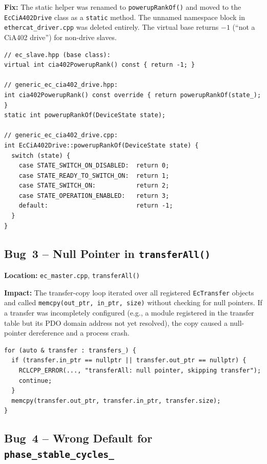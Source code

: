 \documentclass[11pt,a4paper]{article}
\begin{document}
\textbf{Fix:} The static helper was renamed to \texttt{powerupRankOf()} and
moved to the \texttt{EcCiA402Drive} class as a \texttt{static} method.  The
unnamed namespace block in \texttt{ethercat\_driver.cpp} was deleted
entirely.  The virtual base returns $-1$ (``not a CiA402 drive'') for
non-drive slaves.

\begin{lstlisting}[caption={Bug~2: renamed static helper}]
// ec_slave.hpp (base class):
virtual int cia402PowerupRank() const { return -1; }

// generic_ec_cia402_drive.hpp:
int cia402PowerupRank() const override { return powerupRankOf(state_); }
static int powerupRankOf(DeviceState state);

// generic_ec_cia402_drive.cpp:
int EcCiA402Drive::powerupRankOf(DeviceState state) {
  switch (state) {
    case STATE_SWITCH_ON_DISABLED:  return 0;
    case STATE_READY_TO_SWITCH_ON:  return 1;
    case STATE_SWITCH_ON:           return 2;
    case STATE_OPERATION_ENABLED:   return 3;
    default:                        return -1;
  }
}
\end{lstlisting}

\subsection{Bug~3 -- Null Pointer in \texttt{transferAll()}}
\label{sec:bug3}

\textbf{Location:} \texttt{ec\_master.cpp}, \texttt{transferAll()}

\textbf{Impact:} The transfer-copy loop iterated over all registered
\texttt{EcTransfer} objects and called \texttt{memcpy(out\_ptr, in\_ptr,
size)} without checking for null pointers.  If a transfer was incompletely
configured (e.g., a module registered in the transfer table but its PDO
domain address not yet resolved), the copy caused a null-pointer dereference
and a process crash.

\begin{lstlisting}[caption={Bug~3: null-pointer guard in \texttt{transferAll()}}]
for (auto & transfer : transfers_) {
  if (transfer.in_ptr == nullptr || transfer.out_ptr == nullptr) {
    RCLCPP_ERROR(..., "transferAll: null pointer, skipping transfer");
    continue;
  }
  memcpy(transfer.out_ptr, transfer.in_ptr, transfer.size);
}
\end{lstlisting}

\subsection{Bug~4 -- Wrong Default for \texttt{phase\_stable\_cycles\_}}
\label{sec:bug4}
\end{document}
